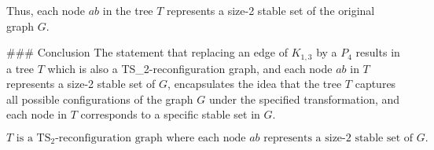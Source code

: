 Thus, each node \(ab\) in the tree \(T\) represents a size-2 stable set of the original graph \(G\).

### Conclusion
The statement that replacing an edge of \(K_{1,3}\) by a \(P_4\) results in a tree \(T\) which is also a TS_2-reconfiguration graph, and each node \(ab\) in \(T\) represents a size-2 stable set of \(G\), encapsulates the idea that the tree \(T\) captures all possible configurations of the graph \(G\) under the specified transformation, and each node in \(T\) corresponds to a specific stable set in \(G\).

\[
\boxed{T \text{ is a TS}_2\text{-reconfiguration graph where each node } ab \text{ represents a size-2 stable set of } G.}
\]